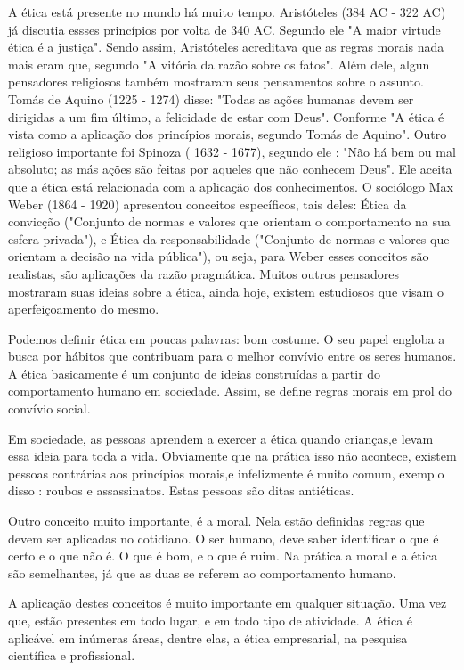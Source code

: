 \documentclass[12pt]{article}
\begin{document}
A ética está presente no mundo há muito tempo. Aristóteles  (384 AC - 322 AC) já discutia essses princípios por volta de 340 AC. Segundo ele "A maior virtude ética é a justiça". Sendo assim, Aristóteles acreditava que as regras morais nada mais eram que, segundo \cite{FABIO} "A vitória da razão sobre os fatos". Além dele, algun pensadores religiosos também mostraram seus pensamentos sobre o assunto. Tomás de Aquino (1225 - 1274) disse: "Todas as ações humanas devem ser dirigidas a um fim último, a felicidade de estar com Deus". Conforme \cite{ORLANDO} "A ética é vista como a aplicação dos princípios morais, segundo Tomás de Aquino". Outro religioso importante foi Spinoza ( 1632 - 1677), segundo ele : "Não há bem ou mal absoluto; as más ações são feitas por aqueles que não conhecem Deus". Ele aceita que a ética está relacionada com a aplicação dos conhecimentos. O sociólogo Max Weber (1864 - 1920) apresentou conceitos específicos, tais deles: Ética da convicção ("Conjunto de normas e valores que orientam o comportamento na sua esfera privada"), e Ética da responsabilidade ("Conjunto de normas e valores que orientam a decisão na vida pública"), ou seja, para Weber esses conceitos são realistas, são aplicações da razão pragmática. Muitos outros pensadores mostraram suas ideias sobre a ética, ainda hoje, existem estudiosos que visam o aperfeiçoamento do mesmo.

Podemos definir ética em poucas palavras: bom costume. O seu papel engloba a busca por hábitos que contribuam para o melhor convívio entre os seres humanos. A ética basicamente é um conjunto de ideias construídas a partir do comportamento humano em sociedade. Assim, se define regras morais em prol do convívio social.

Em sociedade, as pessoas aprendem a exercer a ética quando crianças,e levam essa ideia para toda a vida. Obviamente que na prática isso não acontece, existem pessoas contrárias aos princípios morais,e infelizmente é muito comum, exemplo disso : roubos e assassinatos. Estas pessoas são ditas antiéticas.

Outro conceito muito importante, é a moral. Nela estão definidas regras que devem ser aplicadas no cotidiano. O ser humano, deve saber identificar o que é certo e o que não é. O que é bom, e o que é ruim. Na prática a moral e a ética são semelhantes, já que as duas se referem ao comportamento humano.

A aplicação destes conceitos é muito importante em qualquer situação. Uma vez que, estão presentes em todo lugar, e em todo tipo de atividade. A ética é aplicável em inúmeras áreas, dentre elas, a ética empresarial, na pesquisa científica e profissional.
\end{document}
